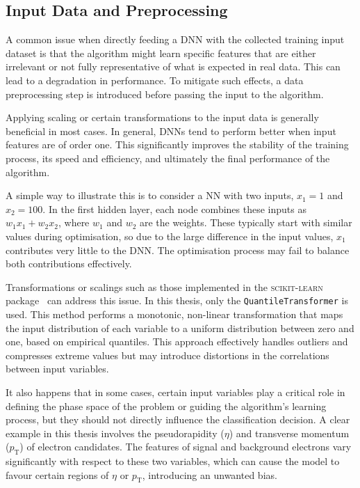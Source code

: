 \subsection{Input Data and Preprocessing}
\label{dnn:preprocessing}

A common issue when directly feeding a DNN with the collected training input dataset is that the algorithm might learn specific features that are either irrelevant or not fully representative of what is expected in real data. This can lead to a degradation in performance. To mitigate such effects, a data preprocessing step is introduced before passing the input to the algorithm.

Applying scaling or certain transformations to the input data is generally beneficial in most cases. In general, DNNs tend to perform better when input features are of order one. This significantly improves the stability of the training process, its speed and efficiency, and ultimately the final performance of the algorithm.

A simple way to illustrate this is to consider a NN with two inputs, $x_{1}=1$ and $x_{2}=100$. In the first hidden layer, each node combines these inputs as $w_{1}x_{1} + w_{2}x_{2}$, where $w_{1}$ and $w_{2}$ are the weights. These typically start with similar values during optimisation, so due to the large difference in the input values, $x_{1}$ contributes very little to the DNN. The optimisation process may fail to balance both contributions effectively.

Transformations or scalings such as those implemented in the \textsc{scikit-learn} package~\cite{scikitlearn} can address this issue. In this thesis, only the \texttt{QuantileTransformer} is used. This method performs a monotonic, non-linear transformation that maps the input distribution of each variable to a uniform distribution between zero and one, based on empirical quantiles. This approach effectively handles outliers and compresses extreme values but may introduce distortions in the correlations between input variables.

It also happens that in some cases, certain input variables play a critical role in defining the phase space of the problem or guiding the algorithm’s learning process, but they should not directly influence the classification decision. A clear example in this thesis involves the pseudorapidity ($\eta$) and transverse momentum ($p_{\text{T}}$) of electron candidates. The features of signal and background electrons vary significantly with respect to these two variables, which can cause the model to favour certain regions of $\eta$ or $p_{\text{T}}$, introducing an unwanted bias.

